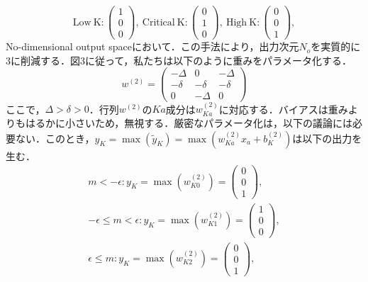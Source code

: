 \documentclass[a4paper,11pt]{jsarticle}
\begin{document}
\begin{equation}
  \text{Low} \ \text{K} :
  \begin{pmatrix}
    1 \\ 0 \\ 0
  \end{pmatrix}, \
  \text{Critical} \ \text{K} :
  \begin{pmatrix}
    0 \\ 1 \\ 0
  \end{pmatrix}, \
  \text{High} \ \text{K} :
  \begin{pmatrix}
    0 \\ 0 \\ 1
  \end{pmatrix},
\end{equation}
No-dimensional output spaceにおいて．この手法により，出力次元$N_o$を実質的に3に削減する．図3に従って，私たちは以下のように重みをパラメータ化する．
\begin{equation}
  w^{(2)} =
  \begin{pmatrix}
    -\Delta & 0       & -\Delta \\
    -\delta & -\delta & -\delta \\
    0       & -\Delta & 0
  \end{pmatrix}
\end{equation}
ここで，$\Delta > \delta > 0$．行列$w^{(2)}$の$Ka$成分は$w_{Ka}^{(2)}$に対応する．バイアスは重みよりもはるかに小さいため，無視する．厳密なパラメータ化は，以下の議論には必要ない．このとき，$y_K = \max{(\tilde{y}_K)}=\max{(w_{Ka}^{(2)}x_a+b_K^{(2)})}$は以下の出力を生む．
\begin{align}
  m<-\epsilon : y_K = \max(w_{K0}^{(2)}) =
  \begin{pmatrix}
    0 \\ 0 \\ 1
  \end{pmatrix}, \\
  -\epsilon \leq m < \epsilon : y_K = \max(w_{K1}^{(2)}) =
  \begin{pmatrix}
    1 \\ 0 \\ 0
  \end{pmatrix}, \\
  \epsilon \leq m : y_K = \max(w_{K2}^{(2)}) =
  \begin{pmatrix}
    0 \\ 0 \\ 1
  \end{pmatrix},
\end{align}
\end{document}
